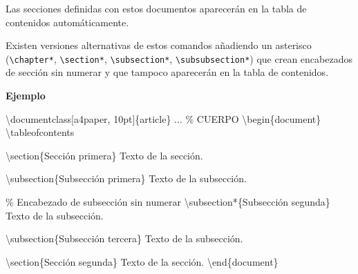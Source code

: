\documentclass[
  a4paper,
]{scrreport}
\newenvironment{Shaded}{\begin{snugshade}}{\end{snugshade}}
\newcommand{\BuiltInTok}[1]{\textcolor[rgb]{0.00,0.23,0.31}{#1}}
\newcommand{\CommentTok}[1]{\textcolor[rgb]{0.37,0.37,0.37}{#1}}
\newcommand{\ExtensionTok}[1]{\textcolor[rgb]{0.00,0.23,0.31}{#1}}
\newcommand{\FunctionTok}[1]{\textcolor[rgb]{0.28,0.35,0.67}{#1}}
\newcommand{\KeywordTok}[1]{\textcolor[rgb]{0.00,0.23,0.31}{#1}}
\newcommand{\NormalTok}[1]{\textcolor[rgb]{0.00,0.23,0.31}{#1}}
\begin{document}
Las secciones definidas con estos documentos aparecerán en la tabla de
contenidos automáticamente.

Existen versiones alternativas de estos comandos añadiendo un asterisco
(\texttt{\textbackslash{}chapter*}, \texttt{\textbackslash{}section*},
\texttt{\textbackslash{}subsection*},
\texttt{\textbackslash{}subsubsection*}) que crean encabezados de
sección sin numerar y que tampoco aparecerán en la tabla de contenidos.

\textbf{Ejemplo}

\begin{Shaded}
\begin{Highlighting}[]
\BuiltInTok{\textbackslash{}documentclass}\NormalTok{[a4paper, 10pt]\{}\ExtensionTok{article}\NormalTok{\}}
\NormalTok{...}
\CommentTok{\% CUERPO}
\KeywordTok{\textbackslash{}begin}\NormalTok{\{}\ExtensionTok{document}\NormalTok{\}}
\FunctionTok{\textbackslash{}tableofcontents}

\KeywordTok{\textbackslash{}section}\NormalTok{\{Sección primera\}}
\NormalTok{Texto de la sección.}

\KeywordTok{\textbackslash{}subsection}\NormalTok{\{Subsección primera\}}
\NormalTok{Texto de la subsección.}

\CommentTok{\% Encabezado de subsección sin numerar}
\KeywordTok{\textbackslash{}subsection*}\NormalTok{\{Subsección segunda\}}
\NormalTok{Texto de la subsección.}

\KeywordTok{\textbackslash{}subsection}\NormalTok{\{Subsección tercera\}}
\NormalTok{Texto de la subsección.}

\KeywordTok{\textbackslash{}section}\NormalTok{\{Sección segunda\}}
\NormalTok{Texto de la sección.}
\KeywordTok{\textbackslash{}end}\NormalTok{\{}\ExtensionTok{document}\NormalTok{\}}
\end{Highlighting}
\end{Shaded}
\end{document}
